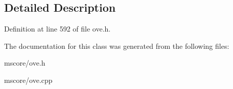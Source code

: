 \subsection{Detailed Description}


Definition at line 592 of file ove.\+h.



The documentation for this class was generated from the following files\+:\begin{DoxyCompactItemize}
\item 
mscore/ove.\+h\item 
mscore/ove.\+cpp\end{DoxyCompactItemize}
